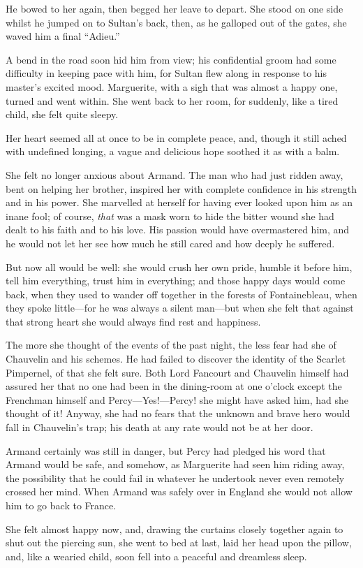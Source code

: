 He bowed to her again, then begged her leave to depart. She stood on one side whilst he jumped on to Sultan's back, then, as he galloped out of the gates, she waved him a final \enquote{Adieu.}

A bend in the road soon hid him from view; his confidential groom had some difficulty in keeping pace with him, for Sultan flew along in response to his master's excited mood. Marguerite, with a sigh that was almost a happy one, turned and went within. She went back to her room, for suddenly, like a tired child, she felt quite sleepy.

Her heart seemed all at once to be in complete peace, and, though it still ached with undefined longing, a vague and delicious hope soothed it as with a balm.

She felt no longer anxious about Armand. The man who had just ridden away, bent on helping her brother, inspired her with complete confidence in his strength and in his power. She marvelled at herself for having ever looked upon him as an inane fool; of course, \textit{that} was a mask worn to hide the bitter wound she had dealt to his faith and to his love. His passion would have overmastered him, and he would not let her see how much he still cared and how deeply he suffered.

But now all would be well: she would crush her own pride, humble it before him, tell him everything, trust him in everything; and those happy days would come back, when they used to wander off together in the forests of Fontainebleau, when they spoke little---for he was always a silent man---but when she felt that against that strong heart she would always find rest and happiness.

The more she thought of the events of the past night, the less fear had she of Chauvelin and his schemes. He had failed to discover the identity of the Scarlet Pimpernel, of that she felt sure. Both Lord Fancourt and Chauvelin himself had assured her that no one had been in the dining-room at one o'clock except the Frenchman himself and Percy---Yes!---Percy! she might have asked him, had she thought of it! Anyway, she had no fears that the unknown and brave hero would fall in Chauvelin's trap; his death at any rate would not be at her door.

Armand certainly was still in danger, but Percy had pledged his word that Armand would be safe, and somehow, as Marguerite had seen him riding away, the possibility that he could fail in whatever he undertook never even remotely crossed her mind. When Armand was safely over in England she would not allow him to go back to France.

She felt almost happy now, and, drawing the curtains closely together again to shut out the piercing sun, she went to bed at last, laid her head upon the pillow, and, like a wearied child, soon fell into a peaceful and dreamless sleep.